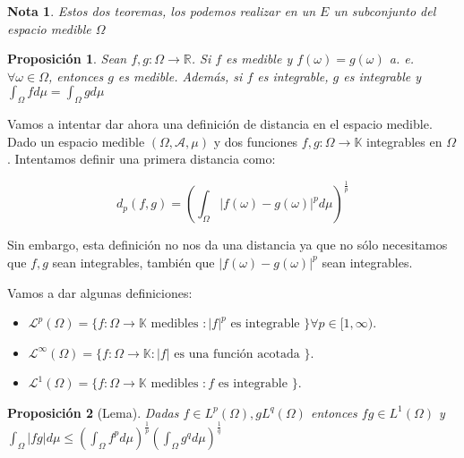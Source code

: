 \documentclass[11pt, a4paper]{article}
\providecommand{\abs}[1]{\lvert#1\rvert}
\newcommand{\R}{\mathbb{R}}
\theoremstyle{theorem-style}
\newtheorem{nprop}{Proposición}[section]
\theoremstyle{definition-style}
\theoremstyle{remark-style}
\newtheorem*{nota}{Nota}
\theoremstyle{example-style}
\begin{document}
\begin{nota}
	Estos dos teoremas, los podemos realizar en un $E$ un subconjunto del espacio medible $\Omega$
\end{nota}


\begin{nprop}
	Sean $f,g: \Omega \to \R$. Si $f$ es medible y $f(\omega) =  g(\omega)$ a. e. $\forall \omega \in \Omega$, entonces $g$ es medible. Además, si $f$ es integrable, $g$ es integrable y $\int_\Omega f d\mu = \int_\Omega g d\mu$
\end{nprop}


Vamos a intentar dar ahora una definición de distancia en el espacio medible. Dado un espacio medible $(\Omega, \mathcal A, \mu)$ y dos funciones $f, g: \Omega \rightarrow \mathbb K$ integrables en $\Omega$. Intentamos definir una primera distancia como:

$$d_p (f, g) = \left( \int_{\Omega} \abs{f(\omega) - g(\omega)}^p d \mu \right)^{\frac{1}{p}}$$

Sin embargo, esta definición no nos da una distancia ya que no sólo necesitamos que $f, g$ sean integrables, también que $\abs{f(\omega) - g(\omega)}^p$ sean integrables.

Vamos a dar algunas definiciones:

\begin{itemize}
	\item $\mathcal L^p (\Omega) = \{ f: \Omega \rightarrow \mathbb K \text{ medibles } : \abs{f}^p \text{ es integrable } \} \forall p \in [1, \infty)$.
	\item $\mathcal L^{\infty} (\Omega) = \{ f: \Omega \rightarrow \mathbb K : \abs{f} \text{ es una función acotada } \}$.
	\item $\mathcal L^{1} (\Omega) = \{ f: \Omega \rightarrow \mathbb K \text{ medibles } : f \text{ es integrable } \}$. 
\end{itemize}

\begin{nprop}[Lema]
	Dadas $f \in L^p (\Omega), g L^q (\Omega)$ entonces $fg \in L^1 (\Omega)$ y $ \displaystyle \int_{\Omega} \abs{fg}d \mu \leq \left( \int_{\Omega} f^p d \mu \right)^{\frac{1}{p}}\left( \int_{\Omega} g^q d \mu \right)^{\frac{1}{q}}$
\end{nprop}
\end{document}
